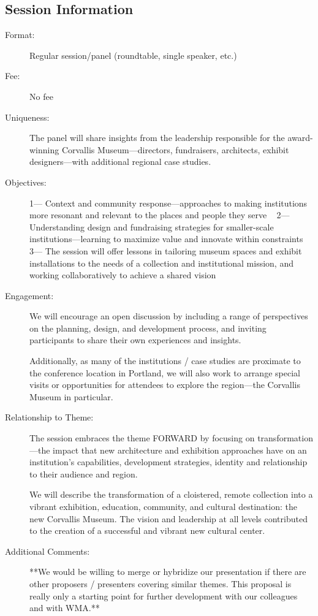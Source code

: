 \documentclass{report}
\begin{document}
              \subsection*{Session Information}
                \begin{description}
                  \item [Format:] Regular session/panel (roundtable, single speaker, etc.)
							    
								  \item [Fee:]No fee
							     
							    \item [Uniqueness:]The panel will share insights from the leadership responsible for the award-winning Corvallis Museum—directors, fundraisers, architects, exhibit designers—with additional regional case studies.
							    \item [Objectives:]1— Context and community response—approaches to making institutions more resonant and relevant to the places and people they serve
 
2—Understanding design and fundraising strategies for smaller-scale institutions—learning to maximize value and innovate within constraints
 
3— The session will offer lessons in tailoring museum spaces and exhibit installations to the needs of a collection and institutional mission, and working collaboratively to achieve a shared vision
							    \item [Engagement:]We will encourage an open discussion by including a range of perspectives on the planning, design, and development process, and inviting participants to share their own experiences and insights.  

Additionally, as many of the institutions / case studies are proximate to the conference location in Portland, we will also work to arrange special visits or opportunities for attendees to explore the region—the Corvallis Museum in particular.
							    \item [Relationship to Theme:]The session embraces the theme FORWARD by focusing on transformation—the impact that new architecture and exhibition approaches have on an institution’s capabilities, development strategies, identity and relationship to their audience and region. 

We will describe the transformation of a cloistered, remote  collection into a vibrant exhibition, education, community, and cultural destination: the new Corvallis Museum. The vision and leadership at all levels contributed to the creation of a successful and vibrant new cultural center.
							    
                    \item [Additional Comments: ]**We would be willing to merge or hybridize our presentation if there are other proposers / presenters covering similar themes. This proposal is really only a starting point for further development with our colleagues and with WMA.**

                \end{description}
\end{document}
